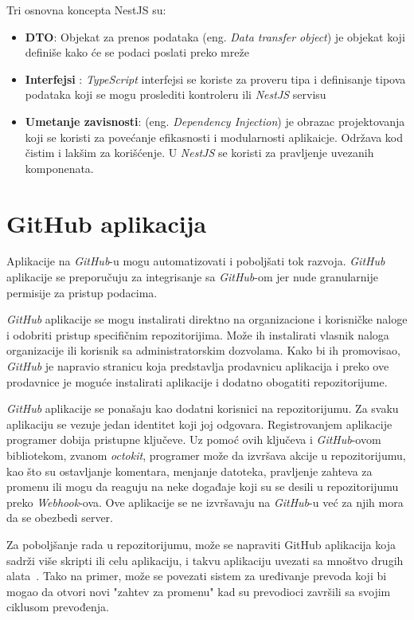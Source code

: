Tri osnovna koncepta NestJS su:
\begin{itemize}
\item \textbf{DTO}: Objekat za prenos podataka (eng. \textit{Data transfer object}) je objekat 
koji definiše kako će se podaci poslati preko mreže
\item \textbf{Interfejsi} : \textit{TypeScript} interfejsi se koriste za proveru tipa i 
definisanje tipova podataka koji se mogu proslediti kontroleru ili \textit{NestJS} servisu
\item \textbf{Umetanje zavisnosti}: (eng. \textit{Dependency Injection}) je obrazac projektovanja 
koji se koristi za povećanje efikasnosti i modularnosti aplikaicje. Održava kod čistim i 
lakšim za korišćenje. U \textit{NestJS} se koristi za pravljenje uvezanih komponenata.~\cite{nest_getting_started}
\end{itemize}

\section{GitHub aplikacija}\label{sec:github_app}
Aplikacije na \textit{GitHub}-u mogu automatizovati i poboljšati tok razvoja. \textit{GitHub} 
aplikacije se preporučuju za integrisanje sa \textit{GitHub}-om jer nude granularnije permisije 
za pristup podacima. 

\textit{GitHub} aplikacije se mogu instalirati direktno na organizacione i korisničke naloge i 
odobriti pristup specifičnim repozitorijima. Može ih instalirati vlasnik naloga organizacije 
ili korisnik sa administratorskim dozvolama. Kako bi ih promovisao, \textit{GitHub} je napravio
stranicu koja predstavlja prodavnicu aplikacija i preko ove prodavnice je moguće instalirati 
aplikacije i dodatno obogatiti repozitorijume.

\textit{GitHub} aplikacije se ponašaju kao dodatni korisnici na repozitorijumu. Za svaku 
aplikaciju se vezuje jedan identitet koji joj odgovara. Registrovanjem aplikacije programer 
dobija pristupne ključeve. Uz pomoć ovih ključeva i \textit{GitHub}-ovom bibliotekom, zvanom \textit{octokit},
programer može da izvršava akcije u repozitorijumu, kao što su ostavljanje komentara,
menjanje datoteka, pravljenje zahteva za promenu ili mogu da reaguju na neke događaje koji su se 
desili u repozitorijumu preko \textit{Webhook}-ova. Ove aplikacije se ne izvršavaju na 
\textit{GitHub}-u već za njih mora da se obezbedi server. 

Za poboljšanje rada u repozitorijumu, može se napraviti GitHub aplikacija koja sadrži više skripti 
ili celu aplikaciju, i takvu aplikaciju uvezati sa mnoštvo drugih alata~\cite{github_apps}. Tako na 
primer, može se povezati sistem za uređivanje prevoda koji bi mogao da otvori novi "zahtev za promenu"
kad su prevodioci završili sa svojim ciklusom prevođenja.

